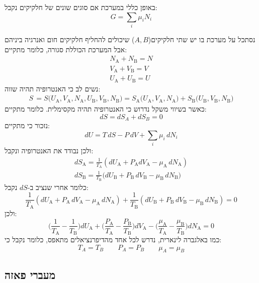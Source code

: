 \documentclass{tstextbook}
\begin{document}
\begin{corollary}
באופן כללי במערכת אם סוגים שונים של חלקיקים נקבל:
$$G=\sum_{i}\mu_{i}N_{i}$$

\end{corollary}
\begin{example}
נסתכל על מערכת בו יש שתי חלקיקים(\(A,B\)) שיכולים להחליף חלקיקים חום ואנרגיה ביניהם אבל המערכת הכוללת סגורה, כלומר מתקיים:
$$\begin{gather}N_{\mathrm{A}}+N_{\mathrm{B}}=N \\V_{\mathrm{{A}}}+V_{\mathrm{{B}}}=V \\U_{\mathrm{{A}}}+U_{\mathrm{{B}}}=U
\end{gather}$$
נשים לב כי האנטרופיה תהיה שווה:
$$\begin{gather}{S\,=S\bigl(U_{\mathrm{A}},V_{\mathrm{A}},N_{\mathrm{A}},U_{\mathrm{B}},V_{\mathrm{B}},N_{\mathrm{B}}\bigr)}{=S_{\mathrm{A}}\bigl(U_{\mathrm{A}},V_{\mathrm{A}},N_{\mathrm{A}}\bigr)\!+\!S_{\mathrm{B}}\bigl(U_{\mathrm{B}},V_{\mathrm{B}},N_{\mathrm{B}}\bigr)}\end{gather}$$
כאשר בשיווי משקל נדרוש כי האנטרופיה תהיה מקסימלית. כלומר מתקיים:
$$dS=dS_{A}+dS_{B}=0$$
נזכור כי מתקיים:
$$d U=T\,d S-P\,d V+\sum_{i}\mu_{i}\,d N_{i}$$
ולכן נבודד את האנטרופיה ונקבל:
$$\begin{gather}d S_{\mathrm{A}}={\frac{1}{T_{\mathrm{A}}}}(d U_{\mathrm{A}}+P_{\mathrm{A}}d V_{\mathrm{A}}-\mu_{\mathrm{A}}\,d N_{\mathrm{A}})  \\  d S_{\mathrm{B}}={\frac{1}{T_{\mathrm{B}}}}\big(d U_{\mathrm{B}}+P_{\mathrm{B}}\,d V_{\mathrm{B}}-\mu_{\mathrm{B}}\,d N_{\mathrm{B}}\big) 
\end{gather}$$
כלומר אחרי שנציב ב-\(dS\) נקבל:
$${\frac{1}{T_{\mathrm{A}}}}(d U_{\mathrm{A}}+P_{\mathrm{A}}\,d V_{\mathrm{A}}-\mu_{\mathrm{A}}\,d N_{\mathrm{A}})+{\frac{1}{T_{\mathrm{B}}}}(d U_{\mathrm{B}}+P_{\mathrm{B}}\,d V_{\mathrm{B}}-\mu_{\mathrm{B}}\,d N_{\mathrm{B}})=0$$
ולכן:
$$\Biggl({\frac{1}{T_{\mathrm{A}}}}-{\frac{1}{T_{\mathrm{B}}}}\Biggr)d U_{\mathrm{A}}+\Biggl({\frac{P_{\mathrm{A}}}{T_{\mathrm{A}}}}-{\frac{P_{\mathrm{B}}}{T_{\mathrm{B}}}}\Biggr)d V_{\mathrm{A}}-\Biggl({\frac{\mu_{\mathrm{A}}}{T_{\mathrm{A}}}}-{\frac{\mu_{\mathrm{B}}}{T_{\mathrm{B}}}}\Biggr)d N_{\mathrm{A}}=0$$
כמו באלגברה לינארית, נדרש לכל אחד מהדיפרנציאלים מתאפס, כלומר נקבל כי:
$$T_{A}=T_{B}\qquad P_{A}=P_{B}\qquad \mu_{A}=\mu_{B}$$

\end{example}
\subsection{מעברי פאזה}
\end{document}
